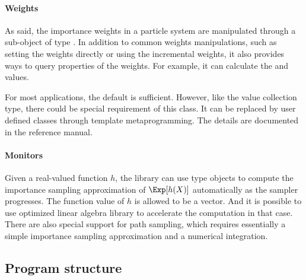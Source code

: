 \paragraph{Weights}

As said, the importance weights in a particle system are manipulated through a sub-object of type . In addition to common weights manipulations, such as setting the weights directly or using the incremental weights, it also provides ways to query properties of the weights. For example, it can calculate the \ess and \cess values.

For most applications, the default  is sufficient. However, like the value collection type, there could be special requirement of this class. It can be replaced by user defined classes through \cpp template metaprogramming. The details are documented in the reference manual.

\paragraph{Monitors}

Given a real-valued function $h$, the library can use  type objects to compute the importance sampling approximation of $\Exp[h(X)]$ automatically as the sampler progresses. The function value of $h$ is allowed to be a vector. And it is possible to use optimized linear algebra library to accelerate the computation in that case. There are also special support for path sampling, which requires essentially a simple importance sampling approximation and a numerical integration.

\subsection{Program structure}
\label{sub:Program structure}

